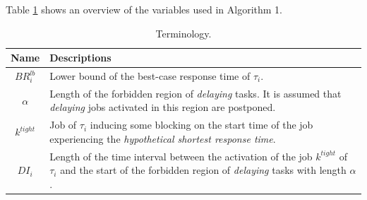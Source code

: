 \documentclass[fleqn]{article}
\begin{document}

Table \ref{tab:terminology_br} shows an overview of the variables used in Algorithm 1.


%

\begin{table}[H]
	\center
	\caption{Terminology.}
	\label{tab:terminology_br}
	\begin{tabular}{|c | p{11cm}|}
		\hline
		Name & Descriptions \\ 
		\hline 
		\hline
		$BR^{lb}_i$& Lower bound of the best-case response time of $\tau_i$.\\
		\hline
		$\alpha$& Length of the forbidden region of \textit{delaying} tasks. It is assumed that \textit{delaying} jobs activated in this region are postponed.\\
		\hline
		$k^{tight}$& Job of $\tau_i$ inducing some blocking on the start time of the job experiencing the \textit{hypothetical shortest response time}.\\
		\hline
		$DI_i$& Length of the time interval between the activation of the job $k^{tight}$ of $\tau_i$ and the start of the forbidden region of \textit{delaying} tasks with length $\alpha$.\\
		\hline 
	\end{tabular}
\end{table} 
\end{document}
